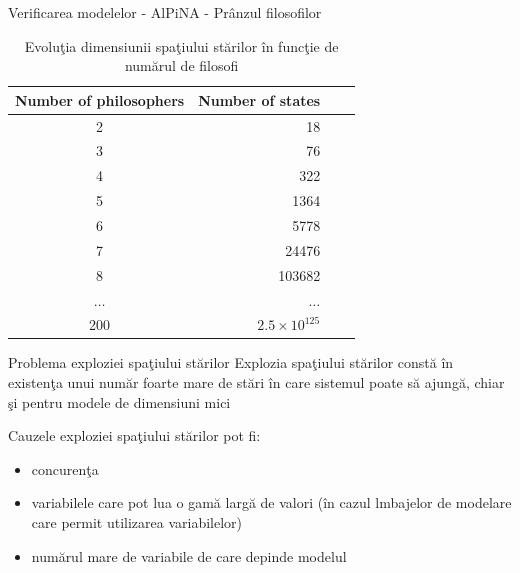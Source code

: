 \documentclass{beamer}
\begin{document}
\begin{frame}{Verificarea modelelor - AlPiNA - Prânzul filosofilor}

\begin{table}[h]
\centering
\begin{tabular}{c r r r}
\hline
Number of philosophers & Number of states\\
\hline
2       &      18\\ %
3       &      76\\ %
4       &     322\\ %
5       &    1364\\ %
6       &    5778\\ %
7       &   24476\\ %
8       &  103682\\ %
$\dots$ & $\dots$\\
200     & $2.5 \times 10^{125}$\\
\hline
\end{tabular}
\caption{Evoluţia dimensiunii spaţiului stărilor în funcţie de numărul de filosofi}
\label{table:quantdata6}
\end{table}
\end{frame}



\begin{frame}{Problema exploziei spaţiului stărilor}
Explozia spaţiului stărilor constă în existenţa unui număr foarte mare de stări în care sistemul poate să ajungă, chiar şi pentru modele de dimensiuni mici

\vspace{0.5cm}

Cauzele exploziei spaţiului stărilor pot fi:
\begin{itemize}
\item
concurenţa
\item
variabilele care pot lua o gamă largă de valori (în cazul lmbajelor de modelare care permit utilizarea variabilelor)
\item
numărul mare de variabile de care depinde modelul
\end{itemize}
\end{frame}
\end{document}
